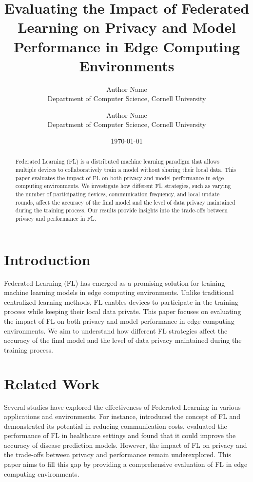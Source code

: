 \documentclass{article}
\title{Evaluating the Impact of Federated Learning on Privacy and Model Performance in Edge Computing Environments}
\author{Author Name \\
Department of Computer Science, Cornell University \\
\and
Author Name \\
Department of Computer Science, Cornell University}
\date{\today}
\begin{document}
\maketitle

\begin{abstract}
Federated Learning (FL) is a distributed machine learning paradigm that allows multiple devices to collaboratively train a model without sharing their local data. This paper evaluates the impact of FL on both privacy and model performance in edge computing environments. We investigate how different FL strategies, such as varying the number of participating devices, communication frequency, and local update rounds, affect the accuracy of the final model and the level of data privacy maintained during the training process. Our results provide insights into the trade-offs between privacy and performance in FL.
\end{abstract}

\section{Introduction}
Federated Learning (FL) has emerged as a promising solution for training machine learning models in edge computing environments. Unlike traditional centralized learning methods, FL enables devices to participate in the training process while keeping their local data private. This paper focuses on evaluating the impact of FL on both privacy and model performance in edge computing environments. We aim to understand how different FL strategies affect the accuracy of the final model and the level of data privacy maintained during the training process.

\section{Related Work}
Several studies have explored the effectiveness of Federated Learning in various applications and environments. For instance, \cite{mcmahan2017communication} introduced the concept of FL and demonstrated its potential in reducing communication costs. \cite{yang2019federated} evaluated the performance of FL in healthcare settings and found that it could improve the accuracy of disease prediction models. However, the impact of FL on privacy and the trade-offs between privacy and performance remain underexplored. This paper aims to fill this gap by providing a comprehensive evaluation of FL in edge computing environments.
\end{document}
